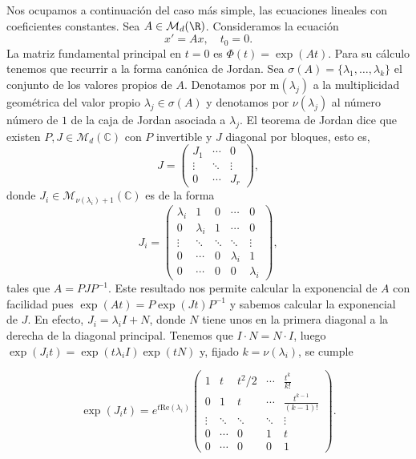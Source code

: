 Nos ocupamos a continuación del caso más simple, las ecuaciones lineales con coeficientes
constantes.  Sea $A \in \mathcal{M}_d(\R)$. Consideramos la ecuación
\begin{equation}
  \label{eq:lineal:cons}
  x' = A x, \quad t_0 = 0.
  \tag{LHC}
\end{equation}
La matriz fundamental principal en $t = 0$ es $\Phi(t) = \exp(At)$. Para su cálculo tenemos que
recurrir a la forma canónica de Jordan. Sea $\sigma(A) = \{\lambda_1, \ldots, \lambda_k\}$ el
conjunto de los valores propios de $A$. Denotamos por $\mathrm{m}(\lambda_j)$ a la multiplicidad
geométrica del valor propio $\lambda_j \in \sigma(A)$ y denotamos por $\nu(\lambda_j)$ al número
número de $1$ de la caja de Jordan asociada a $\lambda_j$. El teorema de Jordan dice que existen
$P, J \in \mathcal{M}_d(\mathbb{C})$ con $P$ invertible y $J$ diagonal por bloques, esto es,
\begin{equation}
  \label{eq:jordan}
  J = \left(
    \begin{matrix}
      J_1 & \cdots & 0 \\
      \vdots  & \ddots  & \vdots \\
      0 & \cdots & J_r
    \end{matrix}
  \right),
\end{equation}
donde $J_i \in \mathcal{M}_{\nu(\lambda_i)+1}(\mathbb{C})$ es de la forma
\begin{equation}
  \label{eq:jordan:bloque}
  J_i = \left(
    \begin{matrix}
      \lambda_i & 1 & 0 & \cdots & 0 \\
      0 & \lambda_i & 1 & \cdots & 0 \\
      \vdots  & \ddots & \ddots  & \ddots & \vdots \\
      0 &  \cdots & 0 & \lambda_i & 1 \\
      0 & \cdots & 0 & 0 & \lambda_i
    \end{matrix}
  \right),
\end{equation}
tales que $A = P J P^{-1}$. Este resultado nos permite calcular la exponencial de $A$ con facilidad
pues $\exp(At) = P \exp(Jt) P^{-1}$ y sabemos calcular la exponencial de $J$. En efecto,
$J_i = \lambda_i I + N$, donde $N$ tiene unos en la primera diagonal a la derecha de la diagonal
principal. Tenemos que $I \cdot N = N \cdot I$, luego $\exp(J_i t) = \exp(t \lambda_i I ) \exp(t N)$
y, fijado $k = \nu(\lambda_i)$, se cumple

\begin{equation}
  \label{eq:jordan:bloque}
  \exp(J_i t) = e^{t \mathrm{Re}(\lambda_i)} \left(
    \begin{matrix}
      1 & t & t^2 / 2 & \cdots & \frac{t^k}{k!} \\
      0 & 1 & t & \cdots & \frac{t^{k-1}}{(k-1)!} \\
      \vdots  & \ddots & \ddots  & \ddots & \vdots \\
      0 & \cdots & 0 & 1 & t \\
      0 & \cdots & 0 & 0 & 1
    \end{matrix}
  \right).
\end{equation}

